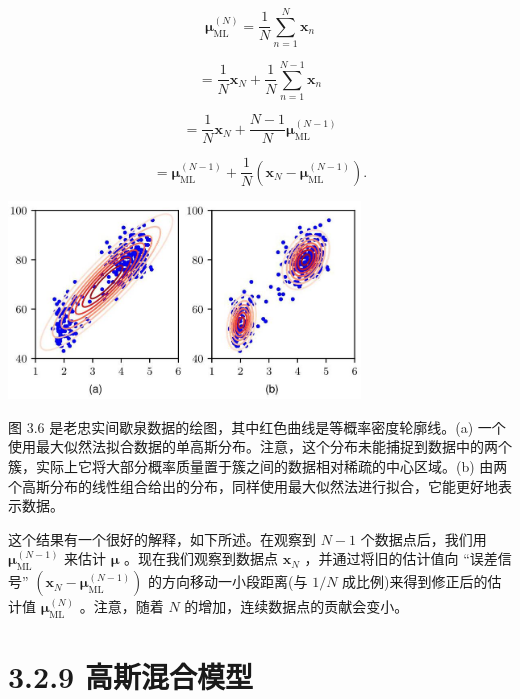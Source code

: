 \documentclass[10pt]{report}
\begin{document}
\[
{\mathbf{\mu }}_{\mathrm{{ML}}}^{\left( N\right) } = \frac{1}{N}\mathop{\sum }\limits_{{n = 1}}^{N}{\mathbf{x}}_{n}
\]

\[
= \frac{1}{N}{\mathbf{x}}_{N} + \frac{1}{N}\mathop{\sum }\limits_{{n = 1}}^{{N - 1}}{\mathbf{x}}_{n}
\]

\[
= \frac{1}{N}{\mathbf{x}}_{N} + \frac{N - 1}{N}{\mathbf{\mu }}_{\mathrm{{ML}}}^{\left( N - 1\right) }
\]

\[
= {\mathbf{\mu }}_{\mathrm{{ML}}}^{\left( N - 1\right) } + \frac{1}{N}\left( {{\mathbf{x}}_{N} - {\mathbf{\mu }}_{\mathrm{{ML}}}^{\left( N - 1\right) }}\right) . \tag{3.110}
\]

\begin{center}
\includegraphics[max width=0.7\textwidth]{images/0194e279-9b28-703a-88f4-c3ac21e2010d_105_664_346_875_492_0.jpg}
\end{center}
\hspace*{3em} 

图 3.6 是老忠实间歇泉数据的绘图，其中红色曲线是等概率密度轮廓线。(a) 一个使用最大似然法拟合数据的单高斯分布。注意，这个分布未能捕捉到数据中的两个簇，实际上它将大部分概率质量置于簇之间的数据相对稀疏的中心区域。(b) 由两个高斯分布的线性组合给出的分布，同样使用最大似然法进行拟合，它能更好地表示数据。

这个结果有一个很好的解释，如下所述。在观察到 \(N - 1\) 个数据点后，我们用 \({\mathbf{\mu }}_{\mathrm{{ML}}}^{\left( N - 1\right) }\) 来估计 \(\mathbf{\mu }\) 。现在我们观察到数据点 \({\mathbf{x}}_{N}\) ，并通过将旧的估计值向 “误差信号” \(\left( {{\mathbf{x}}_{N} - {\mathbf{\mu }}_{\mathrm{{ML}}}^{\left( N - 1\right) }}\right)\) 的方向移动一小段距离(与 \(1/N\) 成比例)来得到修正后的估计值 \({\mathbf{\mu }}_{\mathrm{{ML}}}^{\left( N\right) }\) 。注意，随着 \(N\) 的增加，连续数据点的贡献会变小。

\section*{3.2.9 高斯混合模型}
\end{document}
